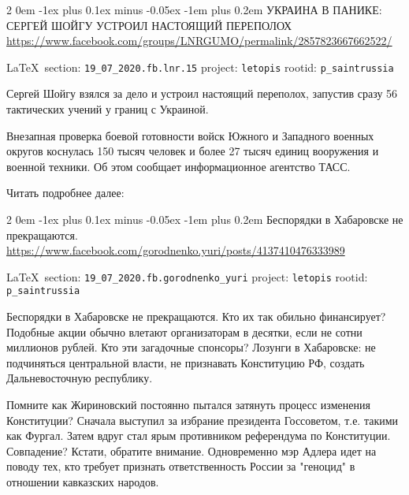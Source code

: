 \documentclass[a4paper,11pt]{extreport}
\makeatletter
\renewcommand\subsection{%
  \clearpage
    \@startsection{subsection}%
    {2}%
    {0em}%
    {-1ex plus 0.1ex minus -0.05ex}%
    {-1em plus 0.2em}%
    {\scshape\bfseries\Large}%
}
\makeatother
\begin{document}
 
\subsection{УКРАИНА В ПАНИКЕ: СЕРГЕЙ ШОЙГУ УСТРОИЛ НАСТОЯЩИЙ ПЕРЕПОЛОХ}
\label{sec:19_07_2020.fb.lnr.15}
\url{https://www.facebook.com/groups/LNRGUMO/permalink/2857823667662522/}
  
\vspace{0.5cm}
{\small\LaTeX~section: \verb|19_07_2020.fb.lnr.15| project: \verb|letopis| rootid: \verb|p_saintrussia|}
\vspace{0.5cm}
 
Сергей Шойгу взялся за дело и устроил настоящий переполох, запустив сразу 56 тактических учений у границ с Украиной.

Внезапная проверка боевой готовности войск Южного и Западного военных округов коснулась 150 тысяч человек и более 27 тысяч единиц вооружения и военной техники. Об этом сообщает информационное агентство ТАСС.

Читать подробнее далее: 

 
 

\subsection{Беспорядки в Хабаровске не прекращаются.}
\label{sec:19_07_2020.fb.gorodnenko_yuri}
\url{https://www.facebook.com/gorodnenko.yuri/posts/4137410476333989}
  
\vspace{0.5cm}
{\small\LaTeX~section: \verb|19_07_2020.fb.gorodnenko_yuri| project: \verb|letopis| rootid: \verb|p_saintrussia|}
\vspace{0.5cm}

Беспорядки в Хабаровске не прекращаются. Кто их так обильно финансирует?
Подобные акции обычно влетают организаторам в десятки, если не сотни миллионов
рублей. Кто эти загадочные спонсоры?  Лозунги в Хабаровске: не подчиняться
центральной власти, не признавать Конституцию РФ, создать Дальневосточную
республику.

Помните как Жириновский постоянно пытался затянуть процесс изменения
Конституции? Сначала выступил за избрание президента Госсоветом, т.е. такими
как Фургал.  Затем вдруг стал ярым противником референдума по Конституции.
Совпадение?  Кстати, обратите внимание. Одновременно мэр Адлера идет на поводу
тех, кто требует признать ответственность России за "геноцид" в отношении
кавказских народов.
\end{document}
